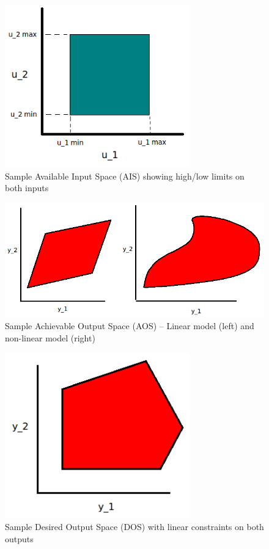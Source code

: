 \begin{figure}[htbp]
  \centering
  \includegraphics[width=8cm]{graph/sample_ais}
  \caption[Sample Available Input Space]{Sample Available Input Space (AIS) showing high/low limits on both inputs}
  \label{fig:sampleais}
\end{figure}

\begin{figure}[htbp]
  \centering
  \includegraphics[width=\fullwidth]{graph/sample_aos}
  \caption[Sample Achievable Output Space]{Sample Achievable Output Space (AOS)
    -- Linear model (left) and non-linear model (right)}
  \label{fig:sampleaos}
\end{figure}

\begin{figure}[htbp]
  \centering
  \includegraphics[width=8cm]{graph/sample_dos}
  \caption[Sample Desired Output Space]{Sample Desired Output Space (DOS) with 
    linear constraints on both outputs}
  \label{fig:sampledos}
\end{figure}

